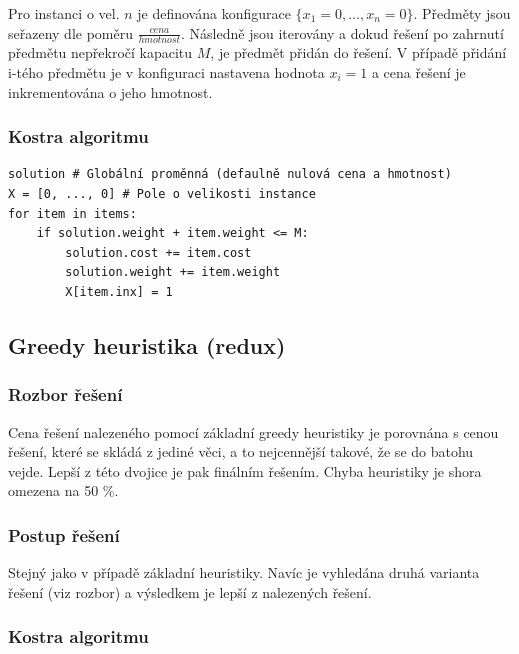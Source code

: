 \documentclass[12pt]{article}
\begin{document}
Pro instanci o vel. $n$ je definována konfigurace $\{x_1=0,...,x_n=0\}$. Předměty jsou seřazeny dle poměru \(\frac{cena}{hmotnost}\). Následně jsou iterovány a dokud řešení po zahrnutí předmětu nepřekročí kapacitu $M$, je předmět přidán do řešení. V případě přidání i-tého předmětu je v konfiguraci nastavena hodnota $x_i=1$ a cena řešení je inkrementována o jeho hmotnost.

\subsubsection{Kostra algoritmu}

\begin{listing}[ht]
    \begin{verbatim}
solution # Globální proměnná (defaulně nulová cena a hmotnost)
X = [0, ..., 0] # Pole o velikosti instance
for item in items:
    if solution.weight + item.weight <= M:
        solution.cost += item.cost
        solution.weight += item.weight
        X[item.inx] = 1
    \end{verbatim}
\end{listing}

\subsection{Greedy heuristika (redux)}

\subsubsection{Rozbor řešení}

Cena řešení nalezeného pomocí základní greedy heuristiky je porovnána s cenou řešení, které se skládá z jediné věci, a to nejcennější takové, že se do batohu vejde. Lepší z této dvojice je pak finálním řešením. Chyba heuristiky je shora omezena na 50 \%.

\subsubsection{Postup řešení}

Stejný jako v případě základní heuristiky. Navíc je vyhledána druhá varianta řešení (viz rozbor) a výsledkem je lepší z nalezených řešení.

\subsubsection{Kostra algoritmu}
\end{document}
